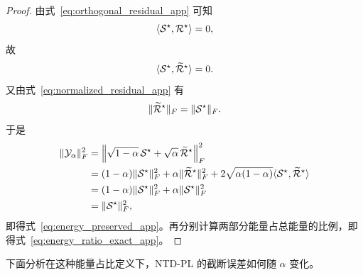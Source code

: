 \begin{proof}
由式~\eqref{eq:orthogonal_residual_app} 可知
\begin{equation}
\langle \mathcal{S}^\star,\mathcal{R}^\star\rangle=0,
\end{equation}
故
\begin{equation}
\langle \mathcal{S}^\star,\widetilde{\mathcal{R}}^\star\rangle=0.
\end{equation}
又由式~\eqref{eq:normalized_residual_app} 有
\begin{equation}
\|\widetilde{\mathcal{R}}^\star\|_F=\|\mathcal{S}^\star\|_F.
\end{equation}
于是
\begin{align}
\|\mathcal{Y}_\alpha\|_F^2
&=
\left\|
\sqrt{1-\alpha}\,\mathcal{S}^\star+\sqrt{\alpha}\,\widetilde{\mathcal{R}}^\star
\right\|_F^2 \\
&=
(1-\alpha)\|\mathcal{S}^\star\|_F^2
+
\alpha\|\widetilde{\mathcal{R}}^\star\|_F^2
+
2\sqrt{\alpha(1-\alpha)}
\langle \mathcal{S}^\star,\widetilde{\mathcal{R}}^\star\rangle \\
&=
(1-\alpha)\|\mathcal{S}^\star\|_F^2+\alpha\|\mathcal{S}^\star\|_F^2 \\
&=
\|\mathcal{S}^\star\|_F^2,
\end{align}
即得式~\eqref{eq:energy_preserved_app}。再分别计算两部分能量占总能量的比例，即得式~\eqref{eq:energy_ratio_exact_app}。
\end{proof}

下面分析在这种能量占比定义下，NTD-PL 的截断误差如何随 $\alpha$ 变化。

